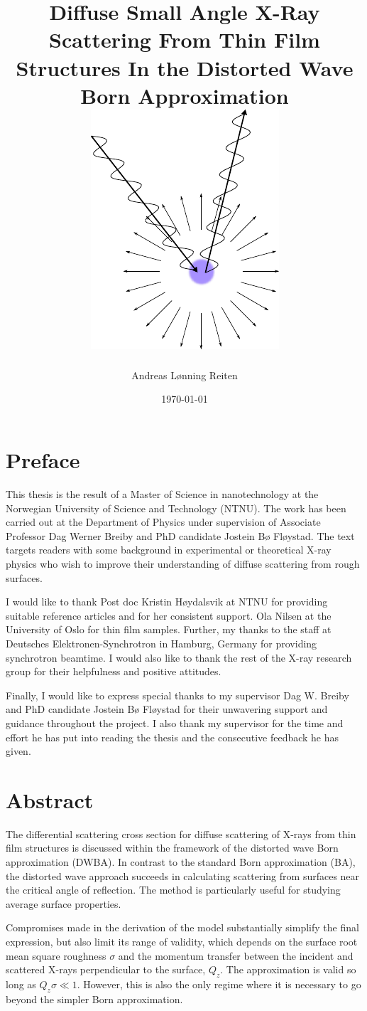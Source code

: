 \documentclass[10pt,twoside, b5paper,pdftex]{report}
\author{Andreas Lønning Reiten}
\date{\today}
\title{Diffuse Small Angle X-Ray Scattering From Thin Film Structures In the Distorted Wave Born Approximation \\
\vspace{0.5cm}
\includegraphics[scale=1.0]{figures/frontpage.pdf}}
\begin{document}
\maketitle

\chapter*{Preface}
This thesis is the result of a Master of Science in nanotechnology at the Norwegian University of Science and Technology (NTNU). The work has been carried out at the Department of Physics under supervision of Associate Professor Dag Werner Breiby and PhD candidate Jostein Bø Fløystad. The text targets readers with some background in experimental or theoretical X-ray physics who wish to improve their understanding of diffuse scattering from rough surfaces.

I would like to thank Post doc Kristin Høydalsvik at NTNU for providing suitable reference articles and for her consistent support. Ola Nilsen at the University of Oslo for thin film samples. Further, my thanks to the staff at Deutsches Elektronen-Synchrotron in Hamburg, Germany for providing synchrotron beamtime. I would also like to thank the rest of the X-ray research group for their helpfulness and positive attitudes. 

Finally, I would like to express special thanks to my supervisor Dag W. Breiby and PhD candidate Jostein Bø Fløystad for their unwavering support and guidance throughout the project. I also thank my supervisor for the time and effort he has put into reading the thesis and the consecutive  feedback he has given.  

\chapter*{Abstract}
The differential scattering cross section  for diffuse scattering of X-rays from thin film structures is discussed within the framework of the distorted wave Born approximation (DWBA). In contrast to the standard Born approximation (BA), the distorted wave approach succeeds in calculating scattering from surfaces near the critical angle of reflection. The method is particularly useful for studying average surface properties. 

Compromises made in the derivation of the model substantially simplify the final expression, but also limit its range of validity, which depends on the surface root mean square roughness $\sigma$ and the momentum transfer between the incident and scattered X-rays perpendicular to the surface, $Q_z$. The approximation is valid so long as $Q_z\sigma \ll 1$. However, this is also the only regime where it is necessary to go beyond the simpler Born approximation.
\end{document}
